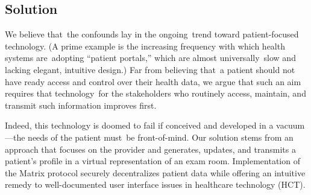\subsection{Solution}
We believe that the confounds lay in the ongoing trend toward patient-focused technology. (A prime example is the increasing frequency with which health systems are adopting ``patient portals,'' which are almost universally slow and lacking elegant, intuitive design.) Far from believing that a patient should not have ready access and control over their health data, we argue that such an aim requires that technology for the stakeholders who routinely access, maintain, and transmit such information improves first.%

Indeed, this technology is doomed to fail if conceived and developed in a vacuum---the needs of the patient must be front-of-mind. Our solution stems from an approach that focuses on the provider and generates, updates, and transmits a patient's profile in a virtual representation of an exam room. Implementation of the Matrix protocol securely decentralizes patient data while offering an intuitive remedy to well-documented user interface issues in healthcare technology (HCT).%
